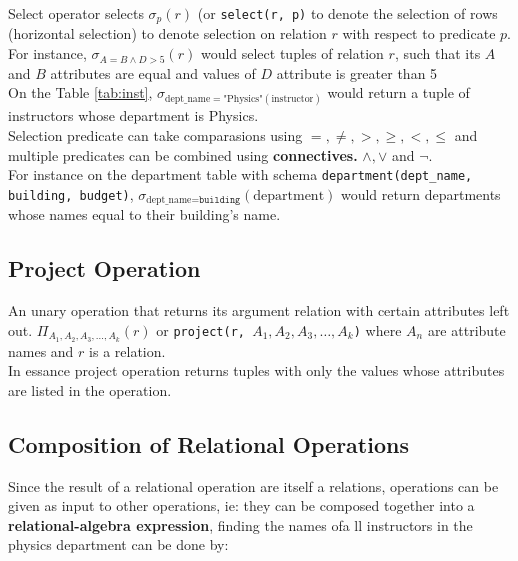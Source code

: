 \documentclass[11pt,a4paper,twocolumn]{book}
\begin{document}
Select operator selects $\sigma_p (r)$ (or \texttt{select(r, p)} to denote the selection of rows (horizontal selection) to denote selection on relation $r$ with respect to predicate $p$.\\

For instance, $\sigma_{A=B \land D>5}(r)$ would select tuples of relation $r$, such that its $A$ and $B$ attributes are equal and values of $D$ attribute is greater than 5\\

On the Table \ref{tab:inst}, $\sigma_{\text{dept\_name}=\text{"Physics"}(\text{instructor})}$ would return a tuple of instructors whose department is Physics.\\

Selection predicate can take comparasions using $=, \neq, >, \geq, <, \leq$ and multiple predicates can be combined using \textbf{connectives.} $\land, \lor$ and $\lnot$.\\

For instance on the department table with schema \texttt{department(dept\_name, building, budget)}, $\sigma_{\text{dept\_name}=\texttt{building}}(\text{department})$ would return departments whose names equal to their building's name.\\

\subsection{Project Operation}

An unary operation that returns its argument relation with certain attributes left out. $\Pi_{A_1, A_2, A_3, \dots, A_k}(r)$ or \texttt{project(r, {$A_1, A_2, A_3, \dots, A_k$})} where $A_n$ are attribute names and $r$ is a relation.\\

In essance project operation returns tuples with only the values whose attributes are listed in the operation.\\

\subsection{Composition of Relational Operations}

Since the result of a relational operation are itself a relations, operations can be given as input to other operations, ie: they can be composed together into a \textbf{relational-algebra expression}, finding the names ofa ll instructors in the physics department can be done by:
\end{document}
